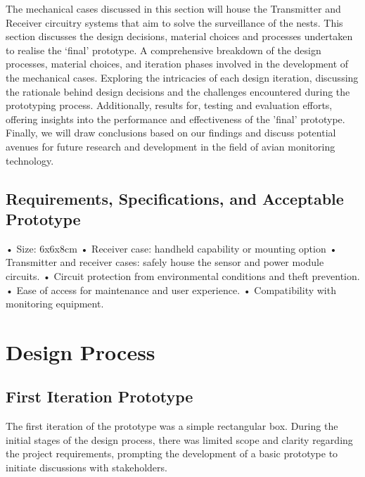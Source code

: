 \documentclass[class=report,11pt,crop=false]{standalone}
\begin{document}
The mechanical cases discussed in this section will house the Transmitter and Receiver circuitry systems that aim to solve the surveillance of the nests. This section discusses the design decisions, material choices and processes undertaken to realise the ‘final’ prototype. 
A comprehensive breakdown of the design processes, material choices, and iteration phases involved in the development of the mechanical cases. Exploring the intricacies of each design iteration, discussing the rationale behind design decisions and the challenges encountered during the prototyping process. Additionally, results for, testing and evaluation efforts, offering insights into the performance and effectiveness of the 'final' prototype. Finally, we will draw conclusions based on our findings and discuss potential avenues for future research and development in the field of avian monitoring technology.
\newline

\subsection{Requirements, Specifications, and Acceptable Prototype}
•	Size: 6x6x8cm\newline
•	Receiver case: handheld capability or mounting option\newline
•	Transmitter and receiver cases: safely house the sensor and power module circuits.\newline
•	Circuit protection from environmental conditions and theft prevention. \newline
•	Ease of access for maintenance and user experience.\newline
•	Compatibility with monitoring equipment.\newline
\newline

\section{Design Process}
\subsection{First Iteration Prototype}
The first iteration of the prototype was a simple rectangular box. During the initial stages of the design process, there was limited scope and clarity regarding the project requirements, prompting the development of a basic prototype to initiate discussions with stakeholders.
\newline
\end{document}
